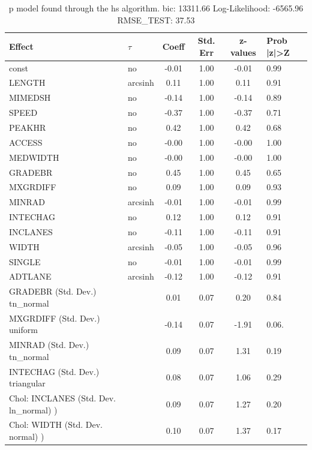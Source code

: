 \begin{table}
	\caption{p model found through the hs algorithm. bic: 13311.66 Log-Likelihood: -6565.96 RMSE_TEST: 37.53}
	\begin{center}
		\begin{tabular}{|l|l|c|c|c|l|}
			\hline
			Effect & $\tau$ & Coeff & Std. Err & z-values & Prob |z|>Z \\
			\hline
			const & no & -0.01 & 1.00 & -0.01 & 0.99 \\
			\hline
			LENGTH & arcsinh & 0.11 & 1.00 & 0.11 & 0.91 \\
			\hline
			MIMEDSH & no & -0.14 & 1.00 & -0.14 & 0.89 \\
			\hline
			SPEED & no & -0.37 & 1.00 & -0.37 & 0.71 \\
			\hline
			PEAKHR & no & 0.42 & 1.00 & 0.42 & 0.68 \\
			\hline
			ACCESS & no & -0.00 & 1.00 & -0.00 & 1.00 \\
			\hline
			MEDWIDTH & no & -0.00 & 1.00 & -0.00 & 1.00 \\
			\hline
			GRADEBR & no & 0.45 & 1.00 & 0.45 & 0.65 \\
			\hline
			MXGRDIFF & no & 0.09 & 1.00 & 0.09 & 0.93 \\
			\hline
			MINRAD & arcsinh & -0.01 & 1.00 & -0.01 & 0.99 \\
			\hline
			INTECHAG & no & 0.12 & 1.00 & 0.12 & 0.91 \\
			\hline
			INCLANES & no & -0.11 & 1.00 & -0.11 & 0.91 \\
			\hline
			WIDTH & arcsinh & -0.05 & 1.00 & -0.05 & 0.96 \\
			\hline
			SINGLE & no & -0.01 & 1.00 & -0.01 & 0.99 \\
			\hline
			ADTLANE & arcsinh & -0.12 & 1.00 & -0.12 & 0.91 \\
			\hline
			GRADEBR (Std. Dev.) tn_normal &  & 0.01 & 0.07 & 0.20 & 0.84 \\
			\hline
			MXGRDIFF (Std. Dev.) uniform &  & -0.14 & 0.07 & -1.91 & 0.06. \\
			\hline
			MINRAD (Std. Dev.) tn_normal &  & 0.09 & 0.07 & 1.31 & 0.19 \\
			\hline
			INTECHAG (Std. Dev.) triangular &  & 0.08 & 0.07 & 1.06 & 0.29 \\
			\hline
			 Chol: INCLANES (Std. Dev. ln_normal) ) &  & 0.09 & 0.07 & 1.27 & 0.20 \\
			\hline
			 Chol: WIDTH (Std. Dev. normal) ) &  & 0.10 & 0.07 & 1.37 & 0.17 \\

\end{tabular}
\end{center}
\end{table}
